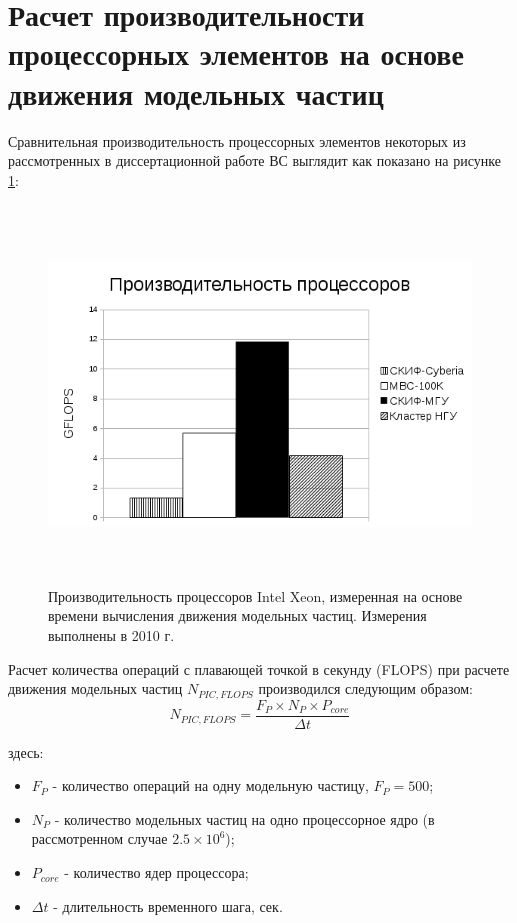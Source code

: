 \section{Расчет производительности процессорных элементов на основе движения модельных частиц}
\label{calc_PE}
 Сравнительная производительность процессорных элементов некоторых из рассмотренных в диссертационной работе ВС выглядит как показано на рисунке  \ref{procs_flops_pic}:

\begin{figure}[htb]
	\begin{center}
		\includegraphics[height=10cm,keepaspectratio]{images/processor_FLOPS_PIC.png}
	\end{center}
	\caption{Производительность процессоров Intel Xeon, измеренная на основе времени вычисления движения модельных частиц. Измерения выполнены в 2010 г.}
	\label{procs_flops_pic}
\end{figure} 

Расчет количества операций с плавающей точкой в секунду (FLOPS) при расчете движения модельных частиц $N_{PIC,FLOPS}$ производился следующим образом:
\begin{equation}
N_{PIC,FLOPS} = \frac{F_P\times N_P \times P_{core}}{\Delta t}
\label{PIC_FLOPS}
\end{equation}

здесь:
\begin{itemize}
	\item $F_P$ - количество операций на одну модельную частицу, $F_P = 500$;
	\item $N_P$ - количество модельных частиц на одно процессорное ядро (в рассмотренном случае $2.5\times 10^6$);  
	\item $P_{core}$ - количество ядер процессора;
	\item $\Delta t$  - длительность временного шага, сек.
\end{itemize}	

